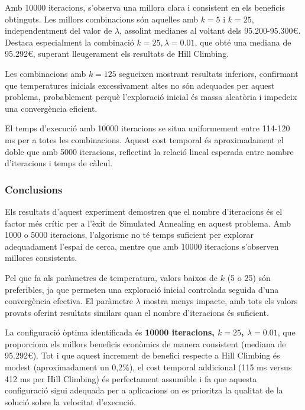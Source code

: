 \vspace{0.5cm}

\vspace{0.5cm}

Amb 10000 iteracions, s'observa una millora clara i consistent en els beneficis obtinguts. Les millors combinacions són aquelles amb $k=5$ i $k=25$, independentment del valor de $\lambda$, assolint medianes al voltant dels 95.200-95.300€. Destaca especialment la combinació $k=25, \lambda=0.01$, que obté una mediana de 95.292€, superant lleugerament els resultats de Hill Climbing.

Les combinacions amb $k=125$ segueixen mostrant resultats inferiors, confirmant que temperatures inicials excessivament altes no són adequades per aquest problema, probablement perquè l'exploració inicial és massa aleatòria i impedeix una convergència eficient.

\vspace{0.5cm}

\vspace{0.5cm}

El temps d'execució amb 10000 iteracions se situa uniformement entre 114-120 ms per a totes les combinacions. Aquest cost temporal és aproximadament el doble que amb 5000 iteracions, reflectint la relació lineal esperada entre nombre d'iteracions i temps de càlcul.

\subsubsection{Conclusions}

Els resultats d'aquest experiment demostren que el nombre d'iteracions és el factor més crític per a l'èxit de Simulated Annealing en aquest problema. Amb 1000 o 5000 iteracions, l'algorisme no té temps suficient per explorar adequadament l'espai de cerca, mentre que amb 10000 iteracions s'observen millores consistents.

Pel que fa als paràmetres de temperatura, valors baixos de $k$ (5 o 25) són preferibles, ja que permeten una exploració inicial controlada seguida d'una convergència efectiva. El paràmetre $\lambda$ mostra menys impacte, amb tots els valors provats oferint resultats similars quan el nombre d'iteracions és suficient.

La configuració òptima identificada és \textbf{10000 iteracions, $k=25$, $\lambda=0.01$}, que proporciona els millors beneficis econòmics de manera consistent (mediana de 95.292€). Tot i que aquest increment de benefici respecte a Hill Climbing és modest (aproximadament un 0,2\%), el cost temporal addicional (115 ms versus 412 ms per Hill Climbing) és perfectament assumible i fa que aquesta configuració sigui adequada per a aplicacions on es prioritza la qualitat de la solució sobre la velocitat d'execució.